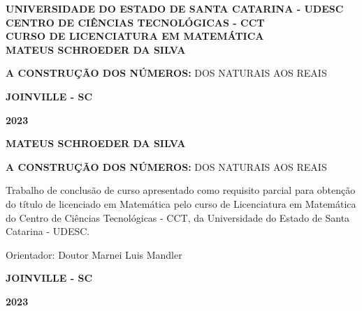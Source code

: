\documentclass[
	12pt,				%
	oneside,			%
	a4paper,			%
	english,			%
	french,				%
	spanish,			%
	brazil,				%
	]{abntex2}
\date{2023}
\theoremstyle{plain}
\theoremstyle{definition}
\newcommand{\authorName}{MATEUS SCHROEDER DA SILVA}
\newcommand{\orientationBy}{Doutor Marnei Luis Mandler}
\newcommand{\titleTGR}{A CONSTRUÇÃO DOS NÚMEROS}
\newcommand{\subtitleTGR}{DOS NATURAIS AOS REAIS}
\newcommand{\titleComplete}{\textbf{\titleTGR:} \subtitleTGR}
\begin{document}
\frenchspacing 


\pretextual

\begin{center}
\thispagestyle{empty}%
 \textbf{ UNIVERSIDADE DO ESTADO DE SANTA CATARINA - UDESC\\
CENTRO DE CIÊNCIAS TECNOLÓGICAS - CCT\\
CURSO DE LICENCIATURA EM MATEMÁTICA\\}
\vspace{4 cm}\textbf{\authorName}

\vspace{4 cm}\titleComplete

\textbf{JOINVILLE - SC}

\textbf{2023}
 \pagebreak
\end{center}



\begin{folhaderosto}

  \begin{center}
    \textbf{\authorName}

    \vspace*{\fill}\vspace*{\fill}
    \titleComplete
    \vspace*{\fill}
  \end{center}
  
  \begin{flushright}
  \begin{minipage}[t]{8 cm}
  { Trabalho de conclusão de curso apresentado como requisito parcial para obtenção do título de licenciado em Matemática pelo curso de Licenciatura em Matemática do Centro de Ciências Tecnológicas - CCT, da Universidade do Estado de Santa Catarina - UDESC. 

 Orientador: \orientationBy}
  \end{minipage}
  \end{flushright}
  
  
  \begin{center}
 \textbf{JOINVILLE - SC}
 
 \textbf{2023} 
  \end{center}
\end{folhaderosto}
\end{document}
